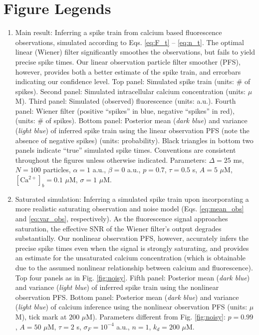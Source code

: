 \documentclass[10pt]{article}
\newcommand{\Ca}{[\text{Ca}^{2+}]}
\begin{document}
\section*{Figure Legends}
\begin{enumerate}
\item Main result: Inferring a spike train from calcium based fluorescence observations, simulated according to Eqs. \ref{eq:F_t} -- \ref{eq:n_t}.  The optimal linear (Wiener) filter significantly smoothes the observations, but fails to yield precise spike times. Our linear observation particle filter smoother (PFS), however, provides both a better estimate of the spike train, and errorbars indicating our confidence level. Top panel: Simulated spike train (units: $\#$ of spikes). Second panel: Simulated intracellular calcium concentration (units: $\mu$M).  Third panel: Simulated (observed) fluorescence (units: a.u.).  Fourth panel: Wiener filter (positive ``spikes'' in blue, negative ``spikes'' in red),  (units: $\#$ of spikes).  Bottom panel: Posterior mean (\emph{dark blue}) and variance (\emph{light blue}) of inferred spike train using the linear observation PFS (note the absence of negative spikes) (units: probability).  Black triangles in bottom two panels indicate ``true'' simulated spike times. Conventions are consistent throughout the figures unless otherwise indicated. Parameters: $\Delta=25$ ms, $N=100$ particles, $\alpha=1$ a.u., $\beta=0$ a.u., $p=0.7$, $\tau=0.5$ s, $A=5$ $\mu$M, $\Ca_b=0.1$ $\mu$M, $\sigma=1$ $\mu$M.
\item Saturated simulation: Inferring a simulated spike train upon incorporating a more realistic saturating observation and noise model (Eqs. \ref{eq:mean_obs} and \ref{eq:var_obs}, respectively). As the fluorescence signal approaches saturation, the effective SNR of the Wiener filter's output degrades substantially.  Our nonlinear observation PFS, however, accurately infers the precise spike times even when the signal is strongly saturating, and provides an estimate for the unsaturated calcium concentration (which is obtainable due to the assumed nonlinear relationship between calcium and fluorescence). Top four panels as in Fig. \ref{fig:noisy}. Fifth panel: Posterior mean (\emph{dark blue}) and variance (\emph{light blue}) of inferred spike train using the nonlinear observation PFS.  Bottom panel: Posterior mean (\emph{dark blue}) and variance (\emph{light blue}) of calcium inference using the nonlinear observation PFS (units: $\mu$M), tick mark at $200$ $\mu$M).  Parameters different from Fig. \ref{fig:noisy}: $p=0.99$, $A=50$ $\mu$M, $\tau=2$ s, $\sigma_F=10^{-4}$ a.u., $n=1$, $k_d=200$ $\mu$M.  

\end{enumerate}
\end{document}
